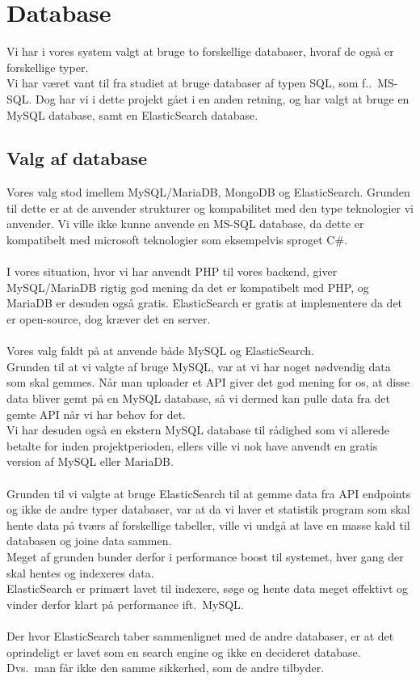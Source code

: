 \section{Database}
Vi har i vores system valgt at bruge to forskellige databaser, hvoraf de også er forskellige typer.
\\
Vi har været vant til fra studiet at bruge databaser af typen SQL, som f.\@eks.\ MS-SQL. Dog har vi i dette projekt
gået i en anden retning, og har valgt at bruge en MySQL database, samt en ElasticSearch database.
\subsection{Valg af database}
Vores valg stod imellem MySQL/MariaDB, MongoDB og ElasticSearch. Grunden til dette er at de anvender strukturer og
kompabilitet med den type teknologier vi anvender. Vi ville ikke kunne anvende en MS-SQL database, da dette er kompatibelt
med microsoft teknologier som eksempelvis sproget C\#.
\\\\
I vores situation, hvor vi har anvendt PHP til vores backend, giver MySQL/MariaDB rigtig god mening da det er kompatibelt med PHP,
og MariaDB er desuden også gratis. ElasticSearch er gratis at implementere da det er open-source, dog kræver det en server.
\\\\
Vores valg faldt på at anvende både MySQL og ElasticSearch.
\\
Grunden til at vi valgte af bruge MySQL, var at vi har noget nødvendig data som skal gemmes. Når man uploader et API giver det god mening
for os, at disse data bliver gemt på en MySQL database, så vi dermed kan pulle data fra det gemte API når vi har behov for det.\\
Vi har desuden også en ekstern MySQL database til rådighed som vi allerede betalte for inden projektperioden, ellers ville vi nok have anvendt en gratis version
af MySQL eller MariaDB.
\\\\
Grunden til vi valgte at bruge ElasticSearch til at gemme data fra API endpoints og ikke de andre typer databaser, var at da vi laver et statistik program
som skal hente data på tværs af forskellige tabeller, ville vi undgå at lave en masse kald til databasen og joine data sammen.
\\
Meget af grunden bunder derfor i performance boost til systemet, hver gang der skal hentes og indexeres data.
\\
ElasticSearch er primært lavet til indexere, søge og hente data meget effektivt og vinder derfor klart på performance ift.\ MySQL\@. 
\\\\
Der hvor ElasticSearch taber sammenlignet med de andre databaser, er at det oprindeligt er lavet som en search engine og ikke en decideret database.
\\Dvs.\ man får ikke den samme sikkerhed, som de andre tilbyder.
